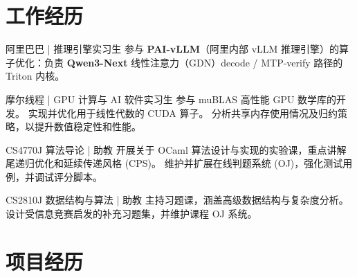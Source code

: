 
\section{工作经历}

\begin{jobshort}{阿里巴巴 | 推理引擎实习生}{\DateAlibabaCn}
参与 \textbf{PAI-vLLM}（阿里内部 vLLM 推理引擎）的算子优化：负责 \textbf{Qwen3-Next} 线性注意力（GDN）decode / MTP-verify 路径的 Triton 内核。
\end{jobshort}

\begin{jobshort}{摩尔线程 | GPU 计算与 AI 软件实习生}{\DateMooreCn}
参与 muBLAS 高性能 GPU 数学库的开发。
实现并优化用于线性代数的 CUDA 算子。
分析共享内存使用情况及归约策略，以提升数值稳定性和性能。
\end{jobshort}

\begin{jobshort}{CS4770J 算法导论 | 助教}{\DateTACn}
开展关于 OCaml 算法设计与实现的实验课，重点讲解尾递归优化和延续传递风格 (CPS)。
维护并扩展在线判题系统 (OJ)，强化测试用例，并调试评分脚本。
\end{jobshort}

\begin{jobshort}{CS2810J 数据结构与算法 | 助教}{\DateTACn}
主持习题课，涵盖高级数据结构与复杂度分析。
设计受信息竞赛启发的补充习题集，并维护课程 OJ 系统。
\end{jobshort}



\section{项目经历}

